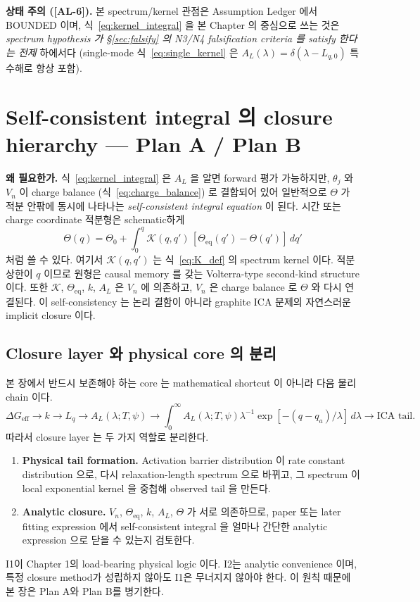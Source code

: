 \documentclass[11pt,a4paper]{article}
\newcommand{\eff}{\mathrm{eff}}
\newcommand{\eq}{\mathrm{eq}}
\newcommand{\AL}[1]{\textsf{[AL-#1]}}
\begin{document}
\textbf{상태 주의 (\AL{6}).} 본 spectrum/kernel 관점은 Assumption Ledger 에서 BOUNDED
이며, 식~\eqref{eq:kernel_integral} 을 본 Chapter 의 중심으로 쓰는 것은 \emph{spectrum
hypothesis 가 \S\ref{sec:falsify} 의 N3/N4 falsification criteria 를 satisfy 한다는 전제} 하에서다
(single-mode 식~\eqref{eq:single_kernel} 은 $A_L(\lambda)=\delta(\lambda-L_{q,0})$ 특수해로 항상 포함).

\section{Self-consistent integral 의 closure hierarchy — Plan A / Plan B}\label{sec:closure}
\textbf{왜 필요한가.} 식~\eqref{eq:kernel_integral} 은 $A_L$ 을 알면 forward 평가 가능하지만,
$\theta_j$ 와 $V_n$ 이 charge balance (식~\eqref{eq:charge_balance}) 로 결합되어 있어 일반적으로
$\Theta$ 가 적분 안팎에 동시에 나타나는 \emph{self-consistent integral equation} 이 된다.
시간 또는 charge coordinate 적분형은 schematic하게
\begin{equation}
\Theta(q)=\Theta_0+\int_0^q \mathcal K(q,q')\,[\Theta_\eq(q')-\Theta(q')]\,dq'
\label{eq:volterra_self}
\end{equation}
처럼 쓸 수 있다. 여기서 $\mathcal K(q,q')$ 는 식~\eqref{eq:K_def} 의 spectrum kernel 이다.
적분 상한이 $q$ 이므로 원형은 causal memory 를 갖는 Volterra-type second-kind structure 이다.
또한 $\mathcal K$, $\Theta_\eq$, $k$, $A_L$ 은 $V_n$ 에 의존하고, $V_n$ 은 charge balance 로
$\Theta$ 와 다시 연결된다. 이 self-consistency 는 논리 결함이 아니라 graphite ICA 문제의
자연스러운 implicit closure 이다.

\subsection{Closure layer 와 physical core 의 분리}\label{sec:closure_core}
본 장에서 반드시 보존해야 하는 core 는 mathematical shortcut 이 아니라 다음 물리 chain 이다.
\[
\Delta G_\eff \rightarrow k \rightarrow L_q \rightarrow A_L(\lambda;T,\psi) \rightarrow
\int_0^\infty A_L(\lambda;T,\psi)\lambda^{-1}
\exp[-(q-q_a)/\lambda]\,d\lambda \rightarrow \text{ICA tail}.
\]
따라서 closure layer 는 두 가지 역할로 분리한다.
\begin{enumerate}[label=\textbf{I\arabic*.}]
\item \textbf{Physical tail formation.} Activation barrier distribution 이 rate constant
  distribution 으로, 다시 relaxation-length spectrum 으로 바뀌고, 그 spectrum 이 local
  exponential kernel 을 중첩해 observed tail 을 만든다.
\item \textbf{Analytic closure.} $V_n$, $\Theta_\eq$, $k$, $A_L$, $\Theta$ 가 서로 의존하므로,
  paper 또는 later fitting expression 에서 self-consistent integral 을 얼마나 간단한 analytic
  expression 으로 닫을 수 있는지 검토한다.
\end{enumerate}
I1이 Chapter 1의 load-bearing physical logic 이다. I2는 analytic convenience 이며, 특정 closure
method가 성립하지 않아도 I1은 무너지지 않아야 한다. 이 원칙 때문에 본 장은 Plan A와 Plan B를
병기한다.
\end{document}
